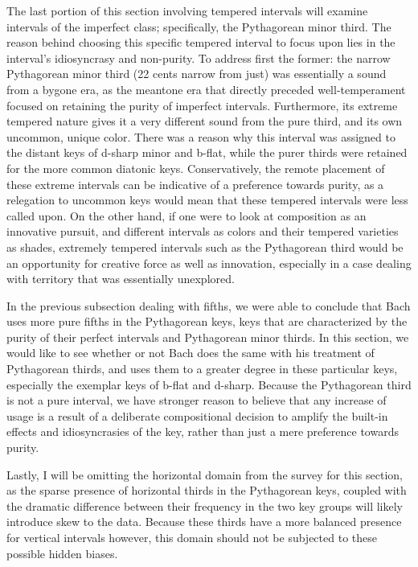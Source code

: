 The last portion of this section involving tempered intervals will
examine intervals of the imperfect class; specifically, the Pythagorean
minor third. The reason behind choosing this specific tempered interval
to focus upon lies in the interval's idiosyncrasy and non-purity. To
address first the former: the narrow Pythagorean minor third (22 cents
narrow from just) was essentially a sound from a bygone era, as the
meantone era that directly preceded well-temperament focused on
retaining the purity of imperfect intervals. Furthermore, its extreme
tempered nature gives it a very different sound from the pure third, and
its own uncommon, unique color. There was a reason why this interval was
assigned to the distant keys of d-sharp minor and b-flat, while the
purer thirds were retained for the more common diatonic keys.
Conservatively, the remote placement of these extreme intervals can be
indicative of a preference towards purity, as a relegation to uncommon
keys would mean that these tempered intervals were less called upon. On
the other hand, if one were to look at composition as an innovative
pursuit, and different intervals as colors and their tempered varieties
as shades, extremely tempered intervals such as the Pythagorean third
would be an opportunity for creative force as well as innovation,
especially in a case dealing with territory that was essentially
unexplored.

In the previous subsection dealing with fifths, we were able to conclude
that Bach uses more pure fifths in the Pythagorean keys, keys that are
characterized by the purity of their perfect intervals and Pythagorean
minor thirds. In this section, we would like to see whether or not Bach
does the same with his treatment of Pythagorean thirds, and uses them to
a greater degree in these particular keys, especially the exemplar keys
of b-flat and d-sharp. Because the Pythagorean third is not a pure
interval, we have stronger reason to believe that any increase of usage
is a result of a deliberate compositional decision to amplify the
built-in effects and idiosyncrasies of the key, rather than just a mere
preference towards purity.

Lastly, I will be omitting the horizontal domain from the survey for
this section, as the sparse presence of horizontal thirds in the
Pythagorean keys, coupled with the dramatic difference between their
frequency in the two key groups will likely introduce skew to the data.
Because these thirds have a more balanced presence for vertical
intervals however, this domain should not be subjected to these possible
hidden biases.

